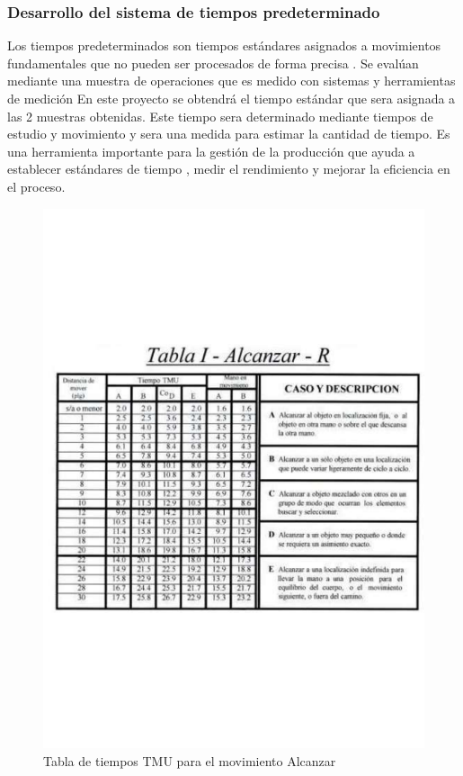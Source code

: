     \subsubsection{Desarrollo del sistema de tiempos predeterminado}
    Los tiempos predeterminados son tiempos estándares asignados a movimientos fundamentales que no pueden ser procesados de forma precisa . Se evalúan mediante una muestra de operaciones que es medido con sistemas y  herramientas de medición En este proyecto se obtendrá el tiempo estándar que sera asignada a las 2 muestras obtenidas. Este tiempo sera determinado mediante tiempos de estudio y movimiento y sera una medida para estimar la cantidad de tiempo.
    Es una herramienta importante para la gestión de la producción que ayuda a establecer estándares de tiempo , medir el rendimiento y mejorar la eficiencia en el proceso.\cite{YS} 
    \begin{figure}[H]
        \centering
        \includegraphics[trim = {20mm 40mm 20mm 25mm},clip,scale=0.25]{9/Img/tablaAlcanzar.pdf}
        \caption{Tabla de tiempos TMU para el movimiento Alcanzar}
        \label{fig:bimanual}
    \end{figure}
